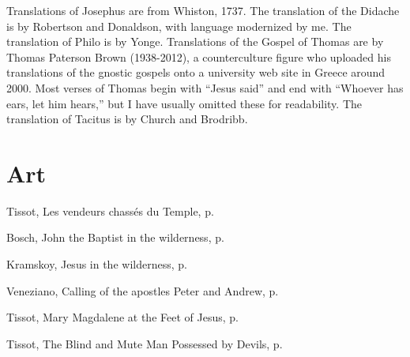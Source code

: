 \documentclass[10pt,a5paper,twoside]{article}
\newcommand{\artcredit}[3]{#2, #3, p.~\pageref{fig:#1}}
\begin{document}
Translations of Josephus are from Whiston, 1737.
The translation of the Didache is by Robertson and Donaldson, with language modernized by me.
The translation of Philo is by Yonge.
Translations of the Gospel of Thomas are  by Thomas Paterson Brown (1938-2012),
a counterculture figure who uploaded his translations of the gnostic gospels onto a university web site
in Greece around 2000. Most verses of Thomas begin with ``Jesus said''
and end with ``Whoever has ears, let him hears,'' but I have usually omitted these for readability.\label{brown-trans}
The translation of Tacitus is by Church and Brodribb.


\vfill

\vfill\pagebreak\section*{Art}
\artcredit{cleansing-temple}{Tissot}{Les vendeurs chassés du Temple}

\artcredit{john-in-the-wilderness}{Bosch}{John the Baptist in the wilderness}

\artcredit{jesus-in-wilderness}{Kramskoy}{Jesus in the wilderness}

\artcredit{fishers-of-men}{Veneziano}{Calling of the apostles Peter and Andrew}

\artcredit{mary-magdalene-at-the-feet-of-jesus}{Tissot}{Mary Magdalene at the Feet of Jesus}

\artcredit{driving-out-demons}{Tissot}{The Blind and Mute Man Possessed by Devils}
\end{document}
